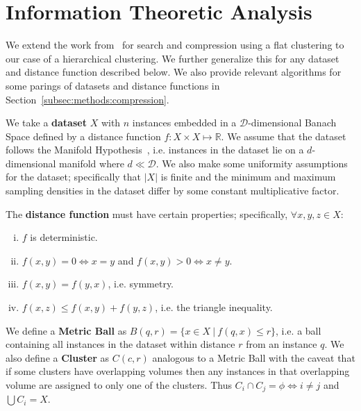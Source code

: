 \section{Information Theoretic Analysis}
\label{sec:information-theoretic-analysis}

We extend the work from~\cite{berger2020levenshtein} for search and compression using a flat clustering to our case of a hierarchical clustering.
We further generalize this for any dataset and distance function described below.
We also provide relevant algorithms for some parings of datasets and distance functions in Section~\ref{subsec:methods:compression}.

We take a \textbf{dataset} $X$ with $n$ instances embedded in a $\mathcal{D}$-dimensional Banach Space defined by a distance function $f: X \times X \mapsto \mathbb{R}$.
We assume that the dataset follows the Manifold Hypothesis~\cite{fefferman2016testing}, i.e. instances in the dataset lie on a $d$-dimensional manifold where $d \ll \mathcal{D}$.
We also make some uniformity assumptions for the dataset;
specifically that $|X|$ is finite and the minimum and maximum sampling densities in the dataset differ by some constant multiplicative factor.

The \textbf{distance function} must have certain properties;
specifically, $\forall x, y, z \in X$:
\begin{enumerate}[i.]
    \item $f$ is deterministic.
    \item $f(x, y) = 0 \Leftrightarrow x = y$ and $f(x, y) > 0 \Leftrightarrow x \neq y$.
    \item $f(x, y) = f(y, x)$, i.e. symmetry.
    \item $f(x, z) \leq f(x, y) + f(y, z)$, i.e. the triangle inequality.
\end{enumerate}


We define a \textbf{Metric Ball} as $B(q, r) = \{ x \in X \ | \ f(q, x) \leq r \}$, i.e. a ball containing all instances in the dataset within distance $r$ from an instance $q$.
We also define a \textbf{Cluster} as $C(c, r)$ analogous to a Metric Ball with the caveat that if some clusters have overlapping volumes then any instances in that overlapping volume are assigned to only one of the clusters.
Thus $C_i \cap C_j = \phi \Leftrightarrow i \neq j$ and $\bigcup C_i = X$.

